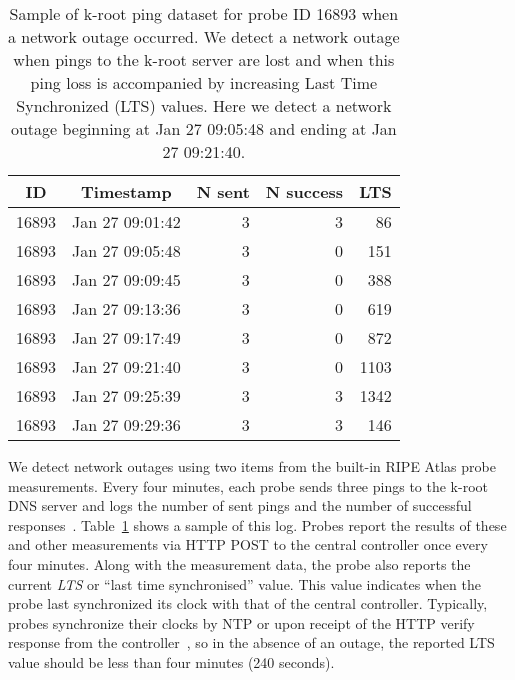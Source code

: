 \begin{table}[th]
  \small
  \centering
  \begin{tabular}{c|r|r|r|r}
    \textbf{ID} & \multicolumn{1}{c|}{\textbf{Timestamp}} & \textbf{N sent} &\textbf{N success} &\textbf{LTS}\\
    \hline
    16893 & Jan 27 09:01:42 & 3 & 3 & 86\\
    16893 & Jan 27 09:05:48 & 3 & 0 & 151\\
    16893 & Jan 27 09:09:45 & 3 & 0 & 388\\
    16893 & Jan 27 09:13:36 & 3 & 0 & 619\\
    16893 & Jan 27 09:17:49 & 3 & 0 & 872\\
    16893 & Jan 27 09:21:40 & 3 & 0 & 1103\\
    16893 & Jan 27 09:25:39 & 3 & 3 & 1342\\
    16893 & Jan 27 09:29:36 & 3 & 3 & 146\\
    \end{tabular}
    \caption[Sample k-root ping data during the occurrence of a
    network outage]{Sample of k-root ping dataset for probe ID 16893 when a network outage occurred. We detect a network outage when pings to the k-root server are lost and when this ping loss is accompanied by increasing Last Time Synchronized (LTS) values. Here we detect a network outage beginning at Jan 27 09:05:48 and ending at Jan 27 09:21:40.}
    \label{tbl:sample_pings}
\end{table}

We detect network outages using two items from the built-in
RIPE Atlas probe measurements.  Every four minutes, each
probe sends three pings to the k-root DNS server and logs
the number of sent pings and the number of successful
responses~\cite{atlas-built-in}.
Table~\ref{tbl:sample_pings} shows a sample of this
log. Probes report the results of these and other
measurements via HTTP POST to the central controller once
every four minutes.  Along with the measurement data, the
probe also reports the current \emph{LTS} or ``last time
synchronised'' value. This value indicates when the probe
last synchronized its clock with that of the central
controller. Typically, probes synchronize their clocks by NTP or upon receipt of the HTTP
verify response from the controller~\cite{homburg-ntp}, so in the absence of an outage, the
reported LTS value should be less than four minutes (240
seconds).

